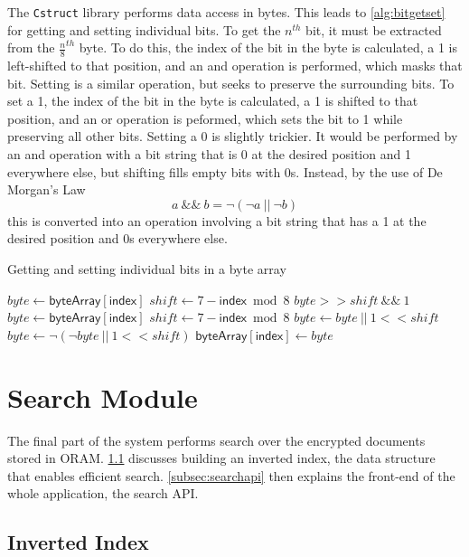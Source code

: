 \documentclass[12pt,a4paper,twoside,openright]{report}
\begin{document}
The \texttt{Cstruct} library performs data access in bytes. This leads to \cref{alg:bitgetset} for getting and setting individual bits. To get the $n^{th}$ bit, it must be extracted from the $\frac{n}{8}^{th}$ byte. To do this, the index of the bit in the byte is calculated, a 1 is left-shifted to that position, and an and operation is performed, which masks that bit. Setting is a similar operation, but seeks to preserve the surrounding bits. To set a 1, the index of the bit in the byte is calculated, a 1 is shifted to that position, and an or operation is peformed, which sets the bit to 1 while preserving all other bits. Setting a 0 is slightly trickier. It would be performed by an and operation with a bit string that is 0 at the desired position and 1 everywhere else, but shifting fills empty bits with 0s. Instead, by the use of De Morgan's Law $$ a~\&\&~b = \neg (\neg a~||~\neg b) $$ this is converted into an operation involving a bit string that has a 1 at the desired position and 0s everywhere else.

\begin{algorithm}[t]
\caption{Getting and setting individual bits in a byte array}
\label{alg:bitgetset}
\begin{algorithmic}
\vskip 10pt
  \State $byte \gets \mathsf{byteArray[index]}$
  \State $shift \gets 7 - \mathsf{index} \bmod 8$
  \State \Return $byte >> shift~\&\&~1$
\EndFunction
\vskip 10pt
  \State $byte \gets \mathsf{byteArray[index]}$
  \State $shift \gets 7 - \mathsf{index} \bmod 8$
    \State $byte \gets byte~||~1 << shift$
  \Else
    \State $byte \gets \neg (\neg byte~||~1 << shift)$
  \EndIf
  \State $\mathsf{byteArray[index]} \gets byte$
\EndFunction
\vskip 10pt
\end{algorithmic}
\end{algorithm}

\section{Search Module}
\label{sec:searchmodule}

The final part of the system performs search over the encrypted documents stored in ORAM. \cref{subsec:invertedindex} discusses building an inverted index, the data structure that enables efficient search. \cref{subsec:searchapi} then explains the front-end of the whole application, the search API.

\subsection{Inverted Index}
\label{subsec:invertedindex}
\end{document}
